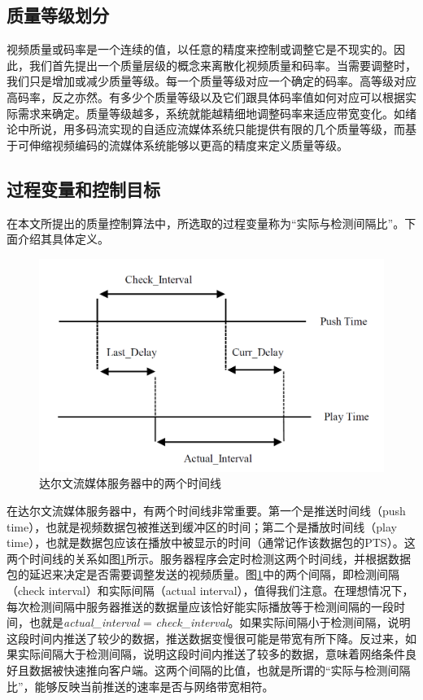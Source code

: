 \subsection{质量等级划分}

视频质量或码率是一个连续的值，以任意的精度来控制或调整它是不现实的。因此，我们首先提出一个质量层级的概念来离散化视频质量和码率。当需要调整时，我们只是增加或减少质量等级。每一个质量等级对应一个确定的码率。高等级对应高码率，反之亦然。有多少个质量等级以及它们跟具体码率值如何对应可以根据实际需求来确定。质量等级越多，系统就能越精细地调整码率来适应带宽变化。如绪论中所说，用多码流实现的自适应流媒体系统只能提供有限的几个质量等级，而基于可伸缩视频编码的流媒体系统能够以更高的精度来定义质量等级。

\subsection{过程变量和控制目标}

在本文所提出的质量控制算法中，所选取的过程变量称为“实际与检测间隔比”。下面介绍其具体定义。

\begin{figure}[h]
	\centering
	\includegraphics[width = 0.9\linewidth]{figures/Intervals.png}
	\caption{达尔文流媒体服务器中的两个时间线 \label{fig:intervals}}
\end{figure}

在达尔文流媒体服务器中，有两个时间线非常重要。第一个是推送时间线（push time），也就是视频数据包被推送到缓冲区的时间；第二个是播放时间线（play time），也就是数据包应该在播放中被显示的时间（通常记作该数据包的PTS）。这两个时间线的关系如图\ref{fig:intervals}所示。服务器程序会定时检测这两个时间线，并根据数据包的延迟来决定是否需要调整发送的视频质量。图\ref{fig:intervals}中的两个间隔，即检测间隔（check interval）和实际间隔（actual interval），值得我们注意。在理想情况下，每次检测间隔中服务器推送的数据量应该恰好能实际播放等于检测间隔的一段时间，也就是\textit{actual\_interval} = \textit{check\_interval}。如果实际间隔小于检测间隔，说明这段时间内推送了较少的数据，推送数据变慢很可能是带宽有所下降。反过来，如果实际间隔大于检测间隔，说明这段时间内推送了较多的数据，意味着网络条件良好且数据被快速推向客户端。这两个间隔的比值，也就是所谓的“实际与检测间隔比”，能够反映当前推送的速率是否与网络带宽相符。

